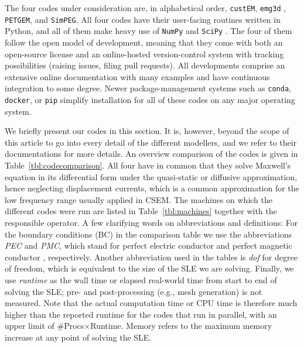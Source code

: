 \documentclass[extra, camera,%
]{gji}
\newcommand{\emg}[2]{\texttt{emg#1#2}\xspace}
\newcommand{\simpeg}{\texttt{SimPEG}\xspace}
\newcommand{\custem}{\texttt{custEM}\xspace}
\newcommand{\petgem}{\texttt{PETGEM}\xspace}
\begin{document}
The four codes under consideration are, in alphabetical order, \custem \citep{GEO.19.Rochlitz}, \emg3d \citep{JOSS.19.Werthmuller}, \petgem \citep{CAG.18.CastilloReyes, GJI.19.CastilloReyes}, and \simpeg \citep{CAG.15.Cockett, CAG.17.Heagy}. All four codes have their user-facing routines written in Python, and all of them make heavy use of \texttt{NumPy} \citep{NAT.20.Harris} and \texttt{SciPy} \citep{NM.20.Virtanen}. The four of them follow the open model of development, meaning that they come with both\deleted{,} an open-source license and an online-hosted version-control system with tracking possibilities (raising issues, filing pull requests). All developments comprise an extensive online documentation with many examples and have continuous integration to some degree. Newer package-management systems such as \texttt{conda}, \texttt{docker}, or \texttt{pip} simplify installation for all of these codes on any major operating system.

We briefly present our codes in this section. It is, however, beyond the scope of this article to go into every detail of the different modellers, and we refer to their documentations for more details. An overview comparison of the codes is given in Table~\ref{tbl:codecomparison}. All four have in common that they solve Maxwell's equation in its differential form  under the quasi-static or diffusive approximation, hence neglecting displacement currents, which is a common approximation for the low frequency range usually applied in CSEM.  The machines on which the different codes were run are listed in Table~\ref{tbl:machines} together with the responsible operator. A few clarifying words on abbreviations and definitions: For the boundary conditions (BC) in the comparison table we use the abbreviations \emph{PEC} and \emph{PMC}, which stand for perfect electric conductor
and perfect magnetic conductor%
, respectively.  Another abbreviation used in the tables is \emph{dof} for degree of freedom, which is equivalent to the size of the SLE we are solving. Finally, we use \emph{runtime} as the wall time or elapsed real-world time from start to end of solving the SLE; pre- and post-processing (e.g., mesh generation) is not measured. Note that the actual computation time or CPU time is therefore much higher than the reported runtime for the codes that run in parallel, with an upper limit of \#Procs$\times$Runtime. Memory refers to the maximum memory increase at any point of solving the SLE.
\end{document}
